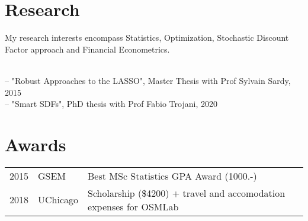 \documentclass[]{deedy-resume-openfont}
\begin{document}
\begin{minipage}[t]{0.66\textwidth}
\section{Research}
My research interests encompass Statistics, Optimization, Stochastic Discount Factor approach and Financial Econometrics. 
\sectionsep

\\ \small
-- "Robust Approaches to the LASSO", Master Thesis with Prof Sylvain Sardy, 2015 \\
-- "Smart SDFs", PhD thesis with Prof Fabio Trojani, 2020 \\


\section{Awards}
\begin{tabular}{rll}
2015	     & GSEM & Best MSc Statistics GPA Award (1000.-)\\
2018         & UChicago & Scholarship (\$4200) + travel and accomodation expenses for OSMLab
\end{tabular}
\sectionsep


% 

\end{minipage} 
\end{document}
